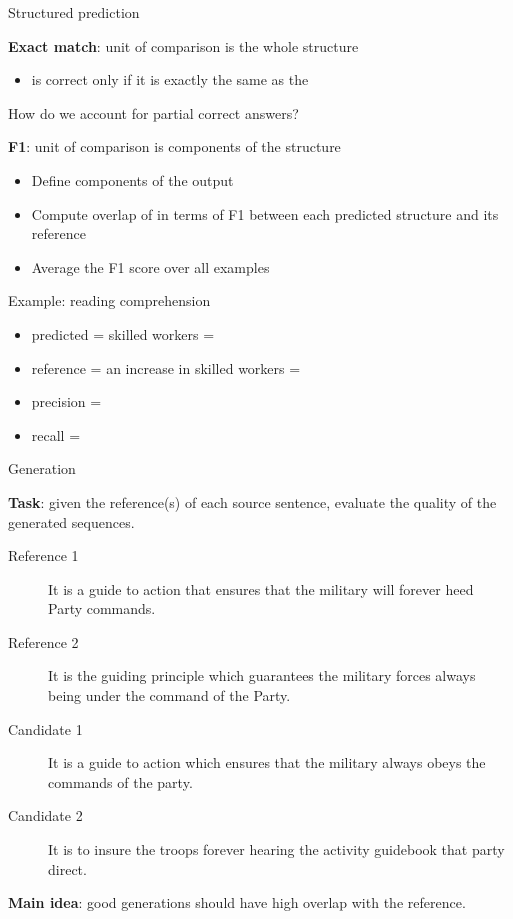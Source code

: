 \documentclass[usenames,dvipsnames,notes,11pt,aspectratio=169,hyperref={colorlinks=true, linkcolor=blue}]{beamer}
\begin{document}
\begin{frame}
    {Structured prediction}

    \textbf{Exact match}: unit of comparison is the whole structure\\
    \begin{itemize}
        \item {} is correct only if it is exactly the same as the 
    \end{itemize}

    \pause
    How do we account for partial correct answers?

    \textbf{F1}: unit of comparison is components of the structure\\
    \begin{itemize}
        \item Define components of the output
        \item Compute overlap of  in terms of F1 between each predicted structure and its reference 
        \item Average the F1 score over all examples
    \end{itemize}
    \pause

    Example: reading comprehension\\
    \begin{itemize}
        \item predicted = skilled workers = 
        \item reference = an increase in skilled workers = 
        \item precision =
        \item recall =
    \end{itemize}
\end{frame}

\begin{frame}
    {Generation}

    \textbf{Task}: given the reference(s) of each source sentence, evaluate the quality of the generated sequences.
    \begin{description}
        \item[Reference 1] It is a guide to action that ensures that the military will forever heed Party commands.
        \item[Reference 2] It is the guiding principle which guarantees the military forces always being under the command of the Party. 
        \item[Candidate 1] It is a guide to action which ensures that the military always obeys the commands of the party.
        \item[Candidate 2] It is to insure the troops forever hearing the activity guidebook that party direct.
    \end{description}


    \textbf{Main idea}: good generations should have high overlap with the reference.
\end{frame}
\end{document}
